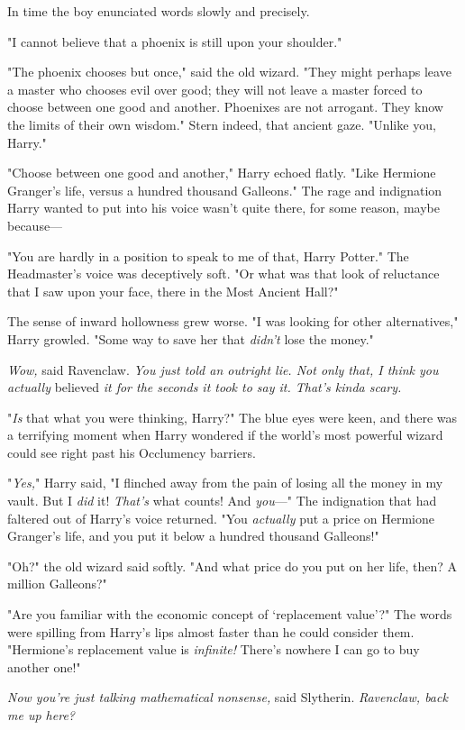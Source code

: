In time the boy enunciated words slowly and precisely.

"I cannot believe that a phoenix is still upon your shoulder."

"The phoenix chooses but once," said the old wizard. "They might perhaps leave
a master who chooses evil over good; they will not leave a master forced to
choose between one good and another. Phoenixes are not arrogant. They know the
limits of their own wisdom." Stern indeed, that ancient gaze. "Unlike you,
Harry."

"Choose between one good and another," Harry echoed flatly. "Like Hermione
Granger's life, versus a hundred thousand Galleons." The rage and indignation
Harry wanted to put into his voice wasn't quite there, for some reason, maybe
because---

"You are hardly in a position to speak to me of that, Harry Potter." The
Headmaster's voice was deceptively soft. "Or what was that look of reluctance
that I saw upon your face, there in the Most Ancient Hall?"

The sense of inward hollowness grew worse. "I was looking for other
alternatives," Harry growled. "Some way to save her that \emph{didn't} lose the
money."

\emph{Wow,} said Ravenclaw. \emph{You just told an outright lie. Not only that,
I think you actually} believed \emph{it for the seconds it took to say it.
That's kinda scary.}

"\emph{Is} that what you were thinking, Harry?" The blue eyes were keen, and
there was a terrifying moment when Harry wondered if the world's most powerful
wizard could see right past his Occlumency barriers.

"\emph{Yes,}" Harry said, "I flinched away from the pain of losing all the
money in my vault. But I \emph{did} it! \emph{That's} what counts! And
\emph{you}---" The indignation that had faltered out of Harry's voice returned.
"You \emph{actually} put a price on Hermione Granger's life, and you put it
below a hundred thousand Galleons!"

"Oh?" the old wizard said softly. "And what price do you put on her life, then?
A million Galleons?"

"Are you familiar with the economic concept of `replacement value'?" The words
were spilling from Harry's lips almost faster than he could consider them.
"Hermione's replacement value is \emph{infinite!} There's nowhere I can go to
buy another one!"

\emph{Now you're just talking mathematical nonsense,} said Slytherin.
\emph{Ravenclaw, back me up here?}

